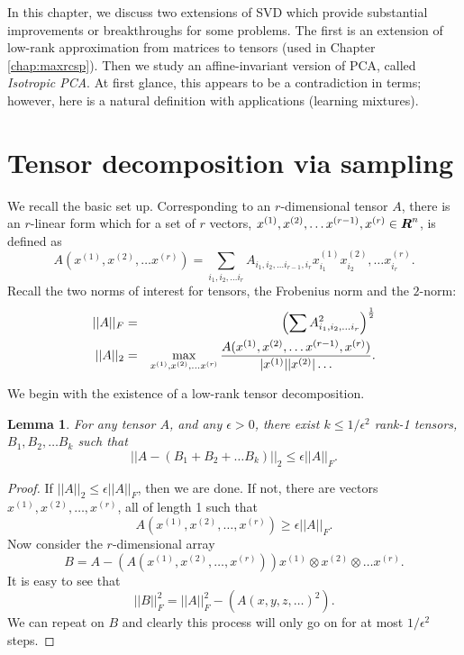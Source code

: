 \documentclass{book}
\newtheorem{lemma}[theorem]{Lemma}
\numberwithin{exercise}{chapter}
\begin{document}
In this chapter, we discuss two extensions of SVD which provide substantial improvements or breakthroughs for some problems. The first is an extension of low-rank approximation from matrices to tensors (used in Chapter \ref{chap:maxrcsp}). Then we study an affine-invariant version of PCA, called {\em Isotropic PCA}. At first glance, this appears to be a contradiction in terms; however, here is a natural definition with applications (learning mixtures). %

\section{Tensor decomposition via sampling}\label{sec:tensorsvd}

We recall the basic set up.
Corresponding to an $r$-dimensional tensor $A$, there is an $r$-linear form
which for a set of $r$ vectors,
$x^{(1)},x^{(2)},\ldots x^{(r-1)},x^{(r)} \in \mbox{\mbox{\boldmath $R$}}^n$, is defined as
$$A(x^{(1)},x^{(2)},\ldots x^{(r)})=
\sum_{i_1,i_2,\ldots i_{r} }
A_{i_1,i_2,\ldots i_{r-1},i_r} x^{(1)}_{i_1}x^{(2)}_{i_2},
\ldots x^{(r)}_{i_{r}}.$$
Recall the two norms of interest for tensors, the Frobenius norm and the $2$-norm:
\begin{eqnarray*}
||A||_F &=&\left(\sum A^2_{i_1,i_2,\ldots i_r}\right)^{\frac{1}{2}}\\
||A||_2 &=& \max_{x^{(1)},x^{(2)},\ldots x^{(r)}}
{A ( x^{(1)},x^{(2)},\ldots x^{(r-1)},x^{(r)} )
\over |x^{(1)}| |x^{(2)}|\ldots }.
\end{eqnarray*}

We begin with the existence of
a low-rank tensor decomposition.

\begin{lemma}\label{lem:LowRankEXIST} For any tensor $A$, and any $\epsilon>0$, there exist
$k\leq 1/\epsilon^2$ rank-1 tensors, $B_1,B_2,\ldots B_k$
such that
$$||A-(B_1+B_2+\ldots B_k)||_2\leq \epsilon ||A||_F.$$
\end{lemma}

\begin{proof}
If $||A||_2\leq\epsilon ||A||_F$, then
we are done. If not, there are vectors
$x^{(1)},x^{(2)},\ldots,x^{(r)}$, all of length 1 such that
\[
A(x^{(1)},x^{(2)},\ldots,x^{(r)}) \geq \epsilon ||A||_F.
\]
Now consider the $r$-dimensional array
\[
B=A-(A(x^{(1)},x^{(2)},\ldots,x^{(r)})) x^{(1)}\otimes x^{(2)}\otimes
\ldots x^{(r)}.
\]
It is easy to see that
\[
||B||_F^2=||A||_F^2-(A(x,y,z,\ldots )^2).
\]
We can repeat on $B$ and clearly this
process will only go on for at most $1/\epsilon^2$ steps.
\end{proof}
\end{document}
